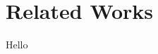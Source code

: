 \documentclass[class=article, crop=false]{standalone}
\begin{document}
\chapter{Related Works}\label{cha:related-works}

Hello \cite{einstein}
\end{document}
